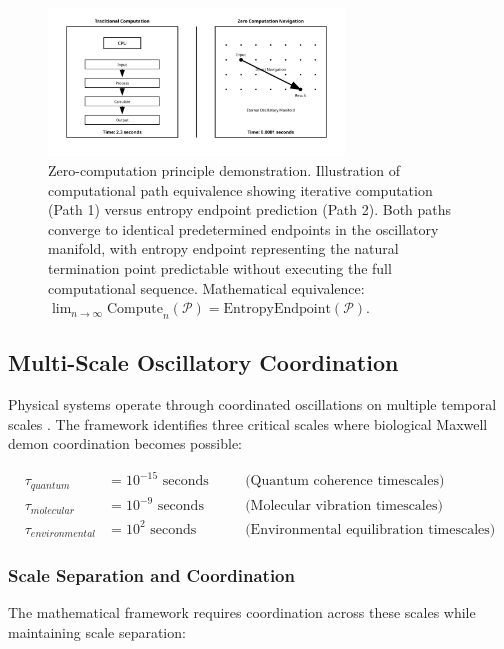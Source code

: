 \documentclass[12pt,a4paper]{article}
\begin{document}
\begin{figure}[H]
    \centering
    \includegraphics[width=0.7\textwidth]{images/zero-computation-principle.pdf}
    \caption{Zero-computation principle demonstration. Illustration of computational path equivalence showing iterative computation (Path 1) versus entropy endpoint prediction (Path 2). Both paths converge to identical predetermined endpoints in the oscillatory manifold, with entropy endpoint representing the natural termination point predictable without executing the full computational sequence. Mathematical equivalence: $\lim_{n \to \infty} \text{Compute}_n(\mathcal{P}) = \text{EntropyEndpoint}(\mathcal{P})$.}
    \label{fig:zero_computation}
\end{figure}


\subsection{Multi-Scale Oscillatory Coordination}

Physical systems operate through coordinated oscillations on multiple temporal scales \cite{ball2011physics,tegmark2000importance}. The framework identifies three critical scales where biological Maxwell demon coordination becomes possible:

\begin{align}
\tau_{quantum} &= 10^{-15} \text{ seconds} \quad &&\text{(Quantum coherence timescales)} \\
\tau_{molecular} &= 10^{-9} \text{ seconds} \quad &&\text{(Molecular vibration timescales)} \\
\tau_{environmental} &= 10^{2} \text{ seconds} \quad &&\text{(Environmental equilibration timescales)}
\end{align}

\subsubsection{Scale Separation and Coordination}

The mathematical framework requires coordination across these scales while maintaining scale separation:
\end{document}
